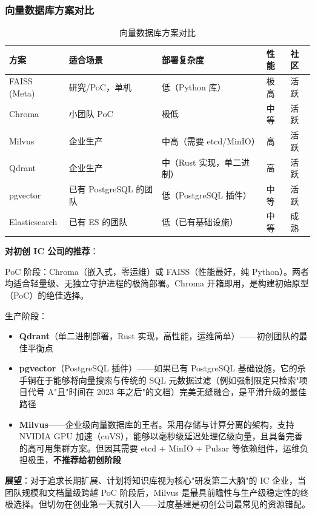\documentclass[UTF8,a4paper,10pt,oneside]{ctexart}
\begin{document}
\subsubsection{向量数据库方案对比}

\begin{table}[htbp]
\centering
\caption{向量数据库方案对比}
\begin{tabular}{p{2.5cm}p{4cm}p{4.5cm}p{1cm}p{1cm}}
\hline
\textbf{方案} & \textbf{适合场景} & \textbf{部署复杂度} & \textbf{性能} & \textbf{社区} \\
\hline
FAISS (Meta) & 研究/PoC，单机 & 低（Python 库）& 极高 & 活跃 \\
Chroma & 小团队 PoC & 极低 & 中等 & 活跃 \\
Milvus & 企业生产 & 中高（需要 etcd/MinIO）& 高 & 活跃 \\
Qdrant & 企业生产 & 中（Rust 实现，单二进制）& 高 & 活跃 \\
pgvector & 已有 PostgreSQL 的团队 & 低（PostgreSQL 插件）& 中等 & 活跃 \\
Elasticsearch & 已有 ES 的团队 & 低（已有基础设施）& 中等 & 成熟 \\
\hline
\end{tabular}
\end{table}

\textbf{对初创 IC 公司的推荐}：

PoC 阶段：Chroma（嵌入式，零运维）或 FAISS（性能最好，纯 Python）。两者均适合轻量级、无独立守护进程的极简部署。Chroma 开箱即用，是构建初始原型（PoC）的绝佳选择。

生产阶段：
\begin{itemize}
    \item \textbf{Qdrant}（单二进制部署，Rust 实现，高性能，运维简单）——初创团队的最佳平衡点
    \item \textbf{pgvector}（PostgreSQL 插件）——如果已有 PostgreSQL 基础设施，它的杀手锏在于能够将向量搜索与传统的 SQL 元数据过滤（例如强制限定只检索"项目代号 A"且"时间在 2023 年之后"的文档）完美无缝融合，是平滑升级的最佳路径
    \item \textbf{Milvus}——企业级向量数据库的王者。采用存储与计算分离的架构，支持 NVIDIA GPU 加速（cuVS），能够以毫秒级延迟处理亿级向量，且具备完善的高可用集群方案。但因其需要 etcd + MinIO + Pulsar 等依赖组件，运维负担极重，\textbf{不推荐给初创阶段}
\end{itemize}

\textbf{展望}：对于追求长期扩展、计划将知识库视为核心"研发第二大脑"的 IC 企业，当团队规模和文档量级跨越 PoC 阶段后，Milvus 是最具前瞻性与生产级稳定性的终极选择。但切勿在创业第一天就引入——过度基建是初创公司最常见的资源错配。
\end{document}
